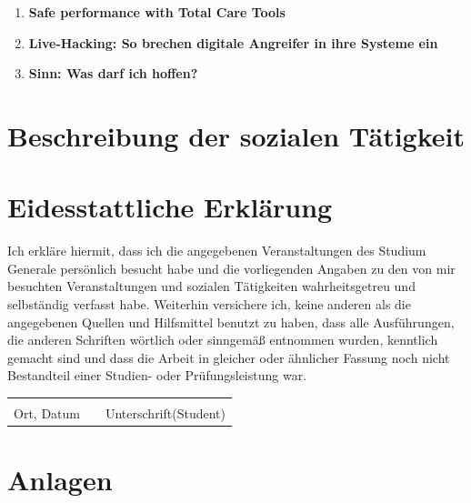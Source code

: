 \documentclass[a4paper, 12pt]{scrartcl} %
\begin{document}
\begin{enumerate}
\vspace{0.5cm}
\item\textbf{Safe performance with Total Care Tools}\par

\vspace{0.5cm}
\item\textbf{Live-Hacking: So brechen digitale Angreifer in ihre Systeme ein}\par

\vspace{0.5cm}
\item\textbf{Sinn: Was darf ich hoffen?}\par
\end{enumerate}
\clearpage
\section{Beschreibung der sozialen Tätigkeit}
\clearpage
\section{Eidesstattliche Erklärung}
\vspace{1cm}
Ich erkläre hiermit, dass ich die angegebenen Veranstaltungen des Studium Generale persönlich
besucht habe und die vorliegenden Angaben zu den von mir besuchten Veranstaltungen
und sozialen Tätigkeiten wahrheitsgetreu und selbständig verfasst habe.
Weiterhin versichere ich, keine anderen als die angegebenen Quellen und Hilfsmittel benutzt zu haben, dass alle Ausführungen, die anderen Schriften wörtlich oder sinngemäß entnommen
wurden, kenntlich gemacht sind und dass die Arbeit in gleicher oder ähnlicher Fassung noch
nicht Bestandteil einer Studien- oder Prüfungsleistung war.
\vspace{2cm}\\
\begin{tabular}{lp{2em}l} 
 \hspace{5cm}   && \hspace{5cm} \\\cline{1-1}\cline{3-3} 
 Ort, Datum     && Unterschrift(Student) 
\end{tabular}

\clearpage
\section{Anlagen}
\end{document}
